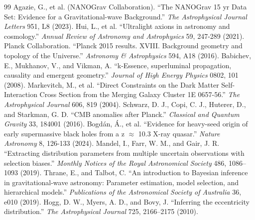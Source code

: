 \documentclass[aps,prd,10pt,onecolumn,superscriptaddress,nofootinbib]{revtex4-2}
\begin{document}
\begin{thebibliography}{99}
 Agazie, G., et al. (NANOGrav Collaboration). ``The NANOGrav 15 yr Data Set: Evidence for a Gravitational-wave Background.'' \textit{The Astrophysical Journal Letters} 951, L8 (2023).
 Hui, L., et al. ``Ultralight axions in astronomy and cosmology.'' \textit{Annual Review of Astronomy and Astrophysics} 59, 247-289 (2021).
 Planck Collaboration. ``Planck 2015 results. XVIII. Background geometry and topology of the Universe.'' \textit{Astronomy \& Astrophysics} 594, A18 (2016).
 Babichev, E., Mukhanov, V., and Vikman, A. ``k-Essence, superluminal propagation, causality and emergent geometry.'' \textit{Journal of High Energy Physics} 0802, 101 (2008).
 Markevitch, M., et al. ``Direct Constraints on the Dark Matter Self-Interaction Cross Section from the Merging Galaxy Cluster 1E 0657-56.'' \textit{The Astrophysical Journal} 606, 819 (2004).
 Schwarz, D. J., Copi, C. J., Huterer, D., and Starkman, G. D. ``CMB anomalies after Planck.'' \textit{Classical and Quantum Gravity} 33, 184001 (2016).
 Bogdán, Á., et al. ``Evidence for heavy-seed origin of early supermassive black holes from a z $\approx$ 10.3 X-ray quasar.'' \textit{Nature Astronomy} 8, 126-133 (2024).
 Mandel, I., Farr, W. M., and Gair, J. R. ``Extracting distribution parameters from multiple uncertain observations with selection biases.'' \textit{Monthly Notices of the Royal Astronomical Society} 486, 1086--1093 (2019).
 Thrane, E., and Talbot, C. ``An introduction to Bayesian inference in gravitational-wave astronomy: Parameter estimation, model selection, and hierarchical models.'' \textit{Publications of the Astronomical Society of Australia} 36, e010 (2019).
 Hogg, D. W., Myers, A. D., and Bovy, J. ``Inferring the eccentricity distribution.'' \textit{The Astrophysical Journal} 725, 2166--2175 (2010).
\end{thebibliography}
\end{document}
